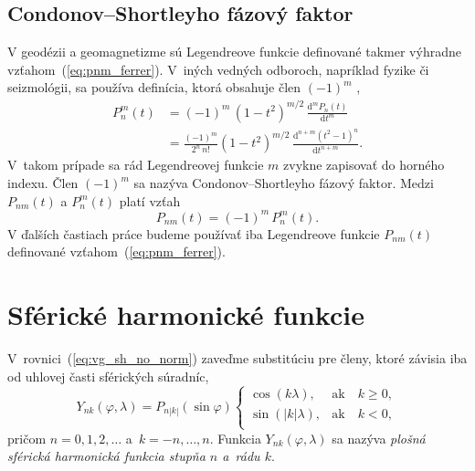 \documentclass[a4paper,12pt]{book}
\newcommand{\diff}{\mathrm d}
\begin{document}
\subsection{Condonov--Shortleyho fázový faktor}
\label{sec:legendre_functions_cs_factor}

V geodézii a geomagnetizme sú Legendreove funkcie definované takmer výhradne 
vzťahom~(\ref{eq:pnm_ferrer}).  V~iných vedných odboroch, napríklad fyzike či 
seizmológii, sa používa definícia, ktorá obsahuje člen $(-1)^m$ 
\parencite[pozri][]{Wieczorek2015,Olver2010},
%
\begin{equation}
\begin{split}
P_n^m(t) &= (-1)^m \, (1 - t^2)^{m \slash 2} \, \frac{\diff^m P_n(t)}{\diff 
t^m}\\
%
&= \frac{(-1)^m}{2^n \, n!} (1 - t^2)^{ m \slash 2} \, \frac{\diff^{n + m}
(t^2 - 1)^n}{\diff t^{n + m}}{.}
\end{split}
\end{equation}
%
V~takom prípade sa rád Legendreovej funkcie $m$ zvykne zapisovať do horného 
indexu.  Člen $(-1)^{m}$ sa nazýva Condonov--Shortleyho fázový faktor.  Medzi 
$P_{nm}(t)$ a $P_n^m(t)$ platí vzťah
%
\begin{equation}
P_{nm}(t) = (-1)^m \, P_n^m(t){.}
\end{equation}
%
V ďalších častiach práce budeme používať iba Legendreove funkcie $P_{nm}(t)$ 
definované vzťahom~(\ref{eq:pnm_ferrer}).




\section{Sférické harmonické funkcie}
\label{sec:spherical_harmonics}

V~rovnici~(\ref{eq:vg_sh_no_norm}) zaveďme substitúciu pre členy, ktoré závisia
iba od uhlovej časti sférických súradníc,
%
\begin{equation}
\label{eq:ynk_no_norm}
Y_{nk}(\varphi, \lambda) = P_{n|k|}(\sin\varphi)
%
\begin{cases}
\cos(k\lambda){,}    &\text{ak} \quad k \geq 0{,}\\
\sin(|k|\lambda){,}  &\text{ak} \quad k < 0{,}\\
\end{cases}
\end{equation}
%
pričom $n = 0, 1, 2, \dots$ a~$k = -n, \dots, n$.  Funkcia $Y_{nk}(\varphi,
\lambda)$ sa nazýva \emph{plošná sférická harmonická funkcia stupňa $n$ a~rádu
$k$}.
\end{document}
